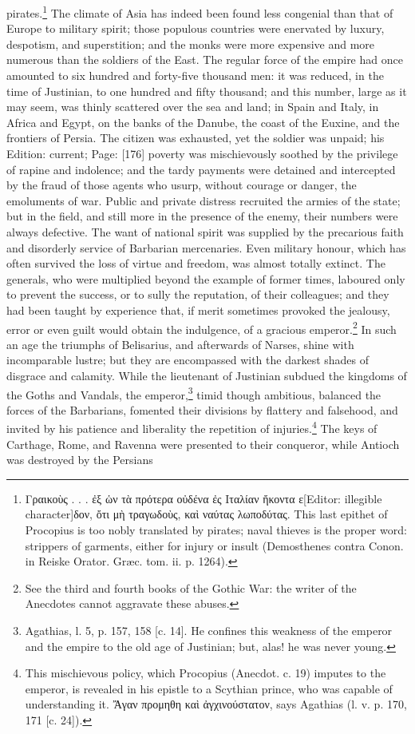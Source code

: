 pirates.\footnote{\textgreek{Γραικο\texthebrew{ὺ}ς . . . \texthebrew{ἐ}ξ \texthebrew{ὡ}ν τ\texthebrew{ὰ} πρότερα ο\texthebrew{ὐ}δένα \texthebrew{ἐ}ς Ιταλίαν \texthebrew{ἤ}κοντα ε}[Editor: illegible character]\textgreek{δον, \texthebrew{ὄ}τι μ\texthebrew{ὴ} τραγωδο\texthebrew{ὺ}ς, κα\texthebrew{ὶ} ναύτας λωποδύτας}. This last epithet of Procopius is too nobly translated by pirates; naval thieves is the proper word: strippers of garments, either for injury or insult (Demosthenes contra Conon. in Reiske Orator. Græc. tom. ii. p. 1264).} The climate of Asia has indeed been found less congenial than that of Europe to military spirit; those populous countries were enervated by luxury, despotism, and superstition; and the monks were more expensive and more numerous than the soldiers of the East. The regular force of the empire had once amounted to six hundred and forty-five thousand men: it was reduced, in the time of Justinian, to one hundred and fifty thousand; and this number, large as it may seem, was thinly scattered over the sea and land; in Spain and Italy, in Africa and Egypt, on the banks of the Danube, the coast of the Euxine, and the frontiers of Persia. The citizen was exhausted, yet the soldier was unpaid; his Edition: current; Page: [176] poverty was mischievously soothed by the privilege of rapine and indolence; and the tardy payments were detained and intercepted by the fraud of those agents who usurp, without courage or danger, the emoluments of war. Public and private distress recruited the armies of the state; but in the field, and still more in the presence of the enemy, their numbers were always defective. The want of national spirit was supplied by the precarious faith and disorderly service of Barbarian mercenaries. Even military honour, which has often survived the loss of virtue and freedom, was almost totally extinct. The generals, who were multiplied beyond the example of former times, laboured only to prevent the success, or to sully the reputation, of their colleagues; and they had been taught by experience that, if merit sometimes provoked the jealousy, error or even guilt would obtain the indulgence, of a gracious emperor.\footnote{See the third and fourth books of the Gothic War: the writer of the Anecdotes cannot aggravate these abuses.} In such an age the triumphs of Belisarius, and afterwards of Narses, shine with incomparable lustre; but they are encompassed with the darkest shades of disgrace and calamity. While the lieutenant of Justinian subdued the kingdoms of the Goths and Vandals, the emperor,\footnote{Agathias, l. 5, p. 157, 158 [c. 14]. He confines this weakness of the emperor and the empire to the old age of Justinian; but, alas! he was never young.} timid though ambitious, balanced the forces of the Barbarians, fomented their divisions by flattery and falsehood, and invited by his patience and liberality the repetition of injuries.\footnote{This mischievous policy, which Procopius (Anecdot. c. 19) imputes to the emperor, is revealed in his epistle to a Scythian prince, who was capable of understanding it. \textgreek{\texthebrew{Ἄ}γαν προμηθη κα\texthebrew{ὶ ἀ}γχινούστατον}, says Agathias (l. v. p. 170, 171 [c. 24]).} The keys of Carthage, Rome, and Ravenna were presented to their conqueror, while Antioch was destroyed by the Persians 